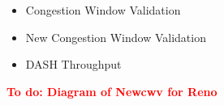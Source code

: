 \documentclass[10pt,sigconf]{acmart}
\newcommand{\todo}[1]{\textbf{\textcolor{red}{To do: #1}}}
\begin{document}


\begin{itemize}
    \item Congestion Window Validation
    \item New Congestion Window Validation
    \item DASH Throughput
\end{itemize}


\todo{Diagram of Newcwv for Reno}



















\end{document}
